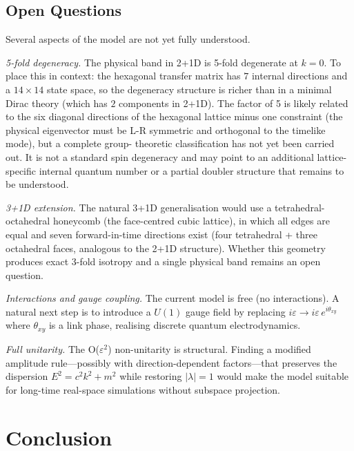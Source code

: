 \documentclass[twocolumn,showpacs,preprintnumbers,amsmath,amssymb]{revtex4-2}
\newcommand{\eps}{\varepsilon}
\begin{document}
\subsection{Open Questions}

Several aspects of the model are not yet fully understood.

\emph{5-fold degeneracy.}
The physical band in 2+1D is 5-fold degenerate at $k=0$.
To place this in context: the hexagonal transfer matrix has $7$ internal
directions and a $14\times14$ state space, so the degeneracy structure is
richer than in a minimal Dirac theory (which has $2$ components in 2+1D).
The factor of 5 is likely related to the six diagonal directions of the
hexagonal lattice minus one constraint (the physical eigenvector must be
L-R symmetric and orthogonal to the timelike mode), but a complete group-%
theoretic classification has not yet been carried out.
It is not a standard spin degeneracy and may point to an additional
lattice-specific internal quantum number or a partial doubler structure
that remains to be understood.

\emph{3+1D extension.}
The natural 3+1D generalisation would use a tetrahedral-octahedral honeycomb
(the face-centred cubic lattice), in which all edges are equal and seven
forward-in-time directions exist (four tetrahedral + three octahedral faces,
analogous to the 2+1D structure).
Whether this geometry produces exact 3-fold isotropy and a single physical
band remains an open question.

\emph{Interactions and gauge coupling.}
The current model is free (no interactions).
A natural next step is to introduce a $U(1)$ gauge field by replacing
$i\eps \to i\eps\, e^{i\theta_{xy}}$ where $\theta_{xy}$ is a link phase,
realising discrete quantum electrodynamics.

\emph{Full unitarity.}
The O($\eps^2$) non-unitarity is structural.
Finding a modified amplitude rule---possibly with direction-dependent
factors---that preserves the dispersion $E^2 = c^2k^2 + m^2$ while
restoring $|\lambda| = 1$ would make the model suitable for long-time
real-space simulations without subspace projection.

\section{Conclusion}
\label{sec:conclusion}
\end{document}
